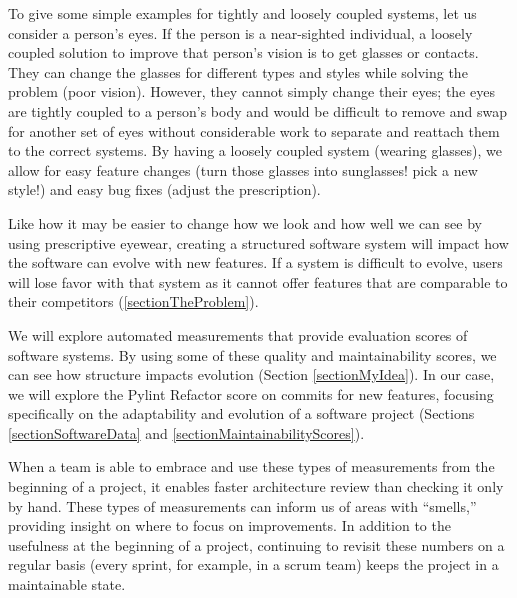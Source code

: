 \documentclass[12pt,conference]{IEEEtran}
\begin{document}
To give some simple examples for tightly and loosely coupled systems, let us consider a person's eyes. If the person is a near-sighted individual, a loosely coupled solution to improve that person's vision is to get glasses or contacts. They can change the glasses for different types and styles while solving the problem (poor vision). However, they cannot simply change their eyes; the eyes are tightly coupled to a person's body and would be difficult to remove and swap for another set of eyes without considerable work to separate and reattach them to the correct systems. By having a loosely coupled system (wearing glasses), we allow for easy feature changes (turn those glasses into sunglasses! pick a new style!) and easy bug fixes (adjust the prescription).

Like how it may be easier to change how we look and how well we can see by using prescriptive eyewear, creating a structured software system will impact how the software can evolve with new features. If a system is difficult to evolve, users will lose favor with that system as it cannot offer features that are comparable to their competitors (\ref{sectionTheProblem}).


We will explore automated measurements that provide evaluation scores of software systems. By using some of these quality and maintainability scores, we can see how structure impacts evolution (Section \ref{sectionMyIdea}). In our case, we will explore the Pylint Refactor score on commits for new features, focusing specifically on the adaptability and evolution of a software project (Sections \ref{sectionSoftwareData} and \ref{sectionMaintainabilityScores}).

When a team is able to embrace and use these types of measurements from the beginning of a project, it enables faster architecture review than checking it only by hand. These types of measurements can inform us of areas with ``smells,'' providing insight on where to focus on improvements. In addition to the usefulness at the beginning of a project, continuing to revisit these numbers on a regular basis (every sprint, for example, in a scrum team) keeps the project in a maintainable state.
\end{document}

